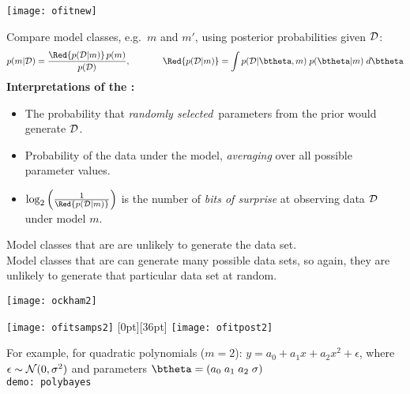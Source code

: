 \centerline{\texttt{[image: ofitnew]}} 


\vspace*{-0.3in}
Compare model classes, e.g.\ $m$ and $m'$, using posterior
probabilities given $\mathcal{D}$: 
\vspace*{-0.2in}
\[
p(m|\D) = \frac{\Red{p(\D|m)} \, p(m)}{p(\D)}, \hspace*{0.5in}
\Red{p(\D|m)} = \int p(\D|\btheta, m) \;
p(\btheta|m) \; d {\btheta}
\]
{\bf Interpretations of the :} 
{\small
\begin{itemize}
\item The probability that {\em randomly selected}\ parameters from the
prior would generate $\mathcal{D}$. 
\item Probability of the data under the model, {\em averaging} over all
  possible parameter values. 
\item $\log_2 \left( \frac{1}{\Red{p(\D|m)}} \right)$ is the number of
  {\em bits of surprise} at observing data $\mathcal{D}$ under model $m$.
\end{itemize}
}

\parbox{5.5in}{
Model classes that are  are unlikely to
generate the data set. \\[-0.5ex]

Model classes that are  can generate many possible
data sets, so again, they are unlikely to generate that particular
data set at random.} \hspace{2ex}
\parbox{4.5in}{
\centerline{\texttt{[image: ockham2]}}
}



\vspace{0.1\oin}
\centerline{\texttt{[image: ofitsamps2]} 
\raisebox{36pt}[0pt][36pt]{
\texttt{[image: ofitpost2]}}}

\vspace*{-2ex}
For example, for quadratic polynomials ($m=2$): $ y = a_0 + a_1 x + a_2
x^2 + \epsilon$, where $\epsilon \sim {\cal   N}(0,\sigma^2)$ and parameters $\btheta = (a_0 \; a_1
\; a_2 \; \sigma)$ \\[1ex]
{\tt demo: polybayes}\\


